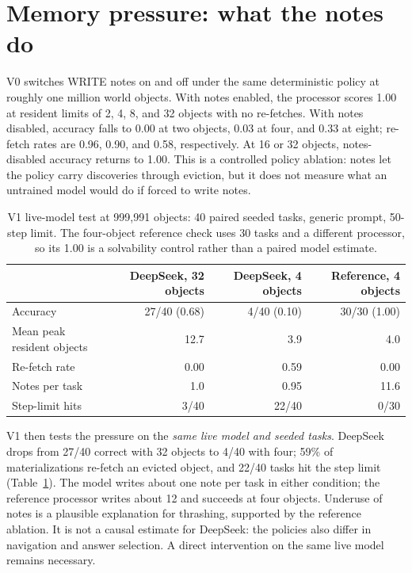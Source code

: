\documentclass[10pt,letterpaper]{article}
\newcommand{\op}[1]{\textsf{#1}}
\begin{document}
\section{Memory pressure: what the notes do}

V0 switches \op{WRITE} notes on and off under the same deterministic policy at roughly one million world objects. With notes enabled, the processor scores 1.00 at resident limits of 2, 4, 8, and 32 objects with no re-fetches. With notes disabled, accuracy falls to 0.00 at two objects, 0.03 at four, and 0.33 at eight; re-fetch rates are 0.96, 0.90, and 0.58, respectively. At 16 or 32 objects, notes-disabled accuracy returns to 1.00. This is a controlled policy ablation: notes let the policy carry discoveries through eviction, but it does not measure what an untrained model would do if forced to write notes.

\begin{table}[t]
\centering\small
\caption{V1 live-model test at 999,991 objects: 40 paired seeded tasks, generic prompt, 50-step limit. The four-object reference check uses 30 tasks and a different processor, so its 1.00 is a solvability control rather than a paired model estimate.}
\label{tab:tight}
\begin{tabular}{lrrr}
\toprule
 & DeepSeek, 32 objects & DeepSeek, 4 objects & Reference, 4 objects\\
\midrule
Accuracy & 27/40 (0.68) & 4/40 (0.10) & 30/30 (1.00)\\
Mean peak resident objects & 12.7 & 3.9 & 4.0\\
Re-fetch rate & 0.00 & 0.59 & 0.00\\
Notes per task & 1.0 & 0.95 & 11.6\\
Step-limit hits & 3/40 & 22/40 & 0/30\\
\bottomrule
\end{tabular}
\end{table}

V1 then tests the pressure on the \emph{same live model and seeded tasks}. DeepSeek drops from 27/40 correct with 32 objects to 4/40 with four; 59\% of materializations re-fetch an evicted object, and 22/40 tasks hit the step limit (Table~\ref{tab:tight}). The model writes about one note per task in either condition; the reference processor writes about 12 and succeeds at four objects. Underuse of notes is a plausible explanation for thrashing, supported by the reference ablation. It is not a causal estimate for DeepSeek: the policies also differ in navigation and answer selection. A direct intervention on the same live model remains necessary.
\end{document}
